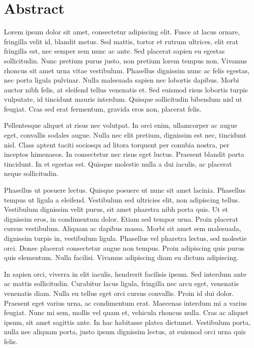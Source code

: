 
\section*{Abstract}

\vspace{30pt}

Lorem ipsum dolor sit amet, consectetur adipiscing elit. Fusce at lacus ornare, fringilla velit id, blandit metus. Sed mattis, tortor et rutrum ultrices, elit erat fringilla est, nec semper sem nunc ac ante. Sed placerat sapien eu egestas sollicitudin. Nunc pretium purus justo, non pretium lorem tempus non. Vivamus rhoncus sit amet urna vitae vestibulum. Phasellus dignissim nunc ac felis egestas, nec porta ligula pulvinar. Nulla malesuada sapien nec lobortis dapibus. Morbi auctor nibh felis, at eleifend tellus venenatis et. Sed euismod risus lobortis turpis vulputate, id tincidunt mauris interdum. Quisque sollicitudin bibendum nisl ut feugiat. Cras sed erat fermentum, gravida eros non, placerat felis.

Pellentesque aliquet at risus nec volutpat. In orci enim, ullamcorper ac augue eget, convallis sodales augue. Nulla nec elit pretium, dignissim est nec, tincidunt nisl. Class aptent taciti sociosqu ad litora torquent per conubia nostra, per inceptos himenaeos. In consectetur nec risus eget luctus. Praesent blandit porta tincidunt. In et egestas est. Quisque molestie nulla a dui iaculis, ac placerat neque sollicitudin.

Phasellus ut posuere lectus. Quisque posuere ut nunc sit amet lacinia. Phasellus tempus ut ligula a eleifend. Vestibulum sed ultricies elit, non adipiscing tellus. Vestibulum dignissim velit purus, sit amet pharetra nibh porta quis. Ut et dignissim eros, in condimentum dolor. Etiam sed tempor urna. Proin placerat cursus vestibulum. Aliquam ac dapibus massa. Morbi sit amet sem malesuada, dignissim turpis in, vestibulum ligula. Phasellus vel pharetra lectus, sed molestie orci. Donec placerat consectetur augue non tempus. Proin adipiscing quis purus quis elementum. Nulla facilisi. Vivamus adipiscing diam eu dictum adipiscing.

In sapien orci, viverra in elit iaculis, hendrerit facilisis ipsum. Sed interdum ante ac mattis sollicitudin. Curabitur lacus ligula, fringilla nec arcu eget, venenatis venenatis diam. Nulla eu tellus eget orci cursus convallis. Proin id dui dolor. Praesent eget varius urna, ac condimentum erat. Maecenas interdum mi a varius feugiat. Nunc mi sem, mollis vel quam et, vehicula rhoncus nulla. Cras ac aliquet ipsum, sit amet sagittis ante. In hac habitasse platea dictumst. Vestibulum porta, nulla nec aliquam porta, justo ipsum dignissim lectus, at euismod orci urna quis felis.
